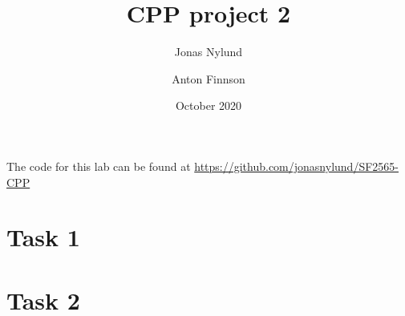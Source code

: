 \documentclass[12pt]{article}
\title{CPP project 2}
\author{Jonas Nylund \and Anton Finnson}
\date{October 2020}
\begin{document}
\maketitle

The code for this lab can be found at \href{https://github.com/jonasnylund/SF2565-CPP}{https://github.com/jonasnylund/SF2565-CPP}

% 

\section{Task 1}

\newpage
\section{Task 2}
\end{document}

